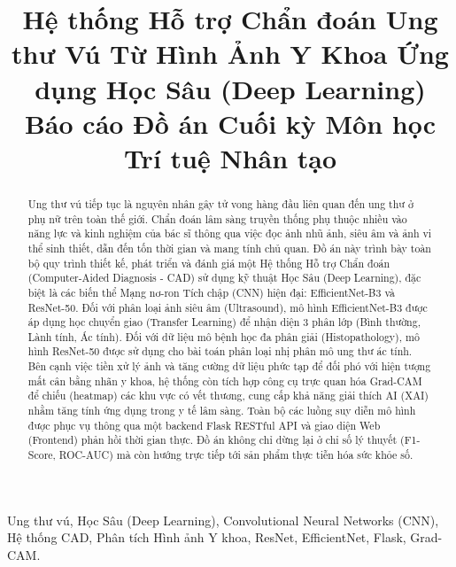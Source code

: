 \documentclass[conference,a4paper]{IEEEtran}
\begin{document}
\title{Hệ thống Hỗ trợ Chẩn đoán Ung thư Vú Từ Hình Ảnh Y Khoa Ứng dụng Học Sâu (Deep Learning)\\
\vspace{0.2cm}
{\Large Báo cáo Đồ án Cuối kỳ Môn học Trí tuệ Nhân tạo}
}


\author{
\and
{}
}

\maketitle


\begin{abstract}
Ung thư vú tiếp tục là nguyên nhân gây tử vong hàng đầu liên quan đến ung thư ở phụ nữ trên toàn thế giới. Chẩn đoán lâm sàng truyền thống phụ thuộc nhiều vào năng lực và kinh nghiệm của bác sĩ thông qua việc đọc ảnh nhũ ảnh, siêu âm và ảnh vi thể sinh thiết, dẫn đến tốn thời gian và mang tính chủ quan. Đồ án này trình bày toàn bộ quy trình thiết kế, phát triển và đánh giá một Hệ thống Hỗ trợ Chẩn đoán (Computer-Aided Diagnosis - CAD) sử dụng kỹ thuật Học Sâu (Deep Learning), đặc biệt là các biến thể Mạng nơ-ron Tích chập (CNN) hiện đại: EfficientNet-B3 và ResNet-50. Đối với phân loại ảnh siêu âm (Ultrasound), mô hình EfficientNet-B3 được áp dụng học chuyển giao (Transfer Learning) để nhận diện 3 phân lớp (Bình thường, Lành tính, Ác tính). Đối với dữ liệu mô bệnh học đa phân giải (Histopathology), mô hình ResNet-50 được sử dụng cho bài toán phân loại nhị phân mô ung thư ác tính. Bên cạnh việc tiền xử lý ảnh và tăng cường dữ liệu phức tạp để đối phó với hiện tượng mất cân bằng nhãn y khoa, hệ thống còn tích hợp công cụ trực quan hóa Grad-CAM để chiếu (heatmap) các khu vực có vết thương, cung cấp khả năng giải thích AI (XAI) nhằm tăng tính ứng dụng trong y tế lâm sàng. Toàn bộ các luồng suy diễn mô hình được phục vụ thông qua một backend Flask RESTful API và giao diện Web (Frontend) phản hồi thời gian thực. Đồ án không chỉ dừng lại ở chỉ số lý thuyết (F1-Score, ROC-AUC) mà còn hướng trực tiếp tới sản phẩm thực tiễn hóa sức khỏe số.
\end{abstract}

\begin{IEEEkeywords}
Ung thư vú, Học Sâu (Deep Learning), Convolutional Neural Networks (CNN), Hệ thống CAD, Phân tích Hình ảnh Y khoa, ResNet, EfficientNet, Flask, Grad-CAM.
\end{IEEEkeywords}
\end{document}
